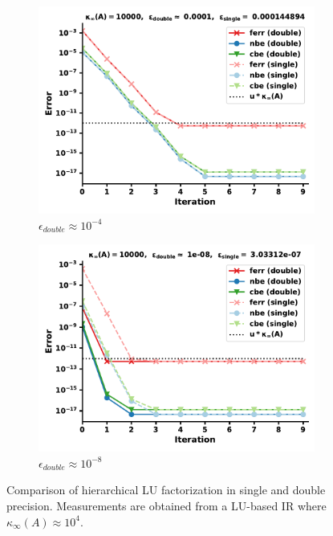 \begin{figure}[h]
\centering
\begin{subfigure}{.5\textwidth}
  \centering
  \includegraphics[width=\linewidth]{chapters/5_experiments/figures/LU512_e1_0s.pdf}
  \caption{$\epsilon_{double} \approx 10^{-4}$}
  \label{fig:lrirs2_1}
\end{subfigure}%
\begin{subfigure}{.5\textwidth}
  \centering
  \includegraphics[width=\linewidth]{chapters/5_experiments/figures/LU512_e1_1s.pdf}
  \caption{$\epsilon_{double} \approx 10^{-8}$}
  \label{fig:lrirs2_2}
\end{subfigure}
\caption[Mixed Precision Low-Rank LU-IR 2]{Comparison of hierarchical LU factorization in single and double precision. Measurements are obtained from a LU-based IR where $\kappa_\infty(A) \approx 10^4$.}
\label{fig:lrirs2}
\end{figure}

